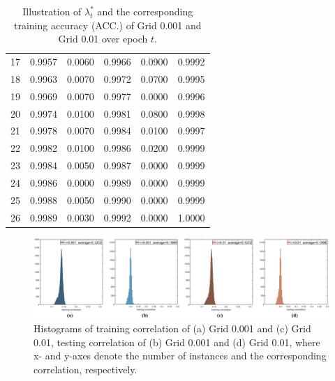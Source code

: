 \documentclass[review,10pt]{JMtemplate}
\begin{document}
\begin{table}[!htb]
\begin{tabular}{l|l|ll|ll}
        17  & 0.9957  & 0.0060  & 0.9966  & 0.0900  & 0.9992  \\ 
        18  & 0.9963  & 0.0070  & 0.9972  & 0.0700  & 0.9995  \\ 
        19  & 0.9969  & 0.0070  & 0.9977  & 0.0000  & 0.9996  \\ 
        20  & 0.9974  & 0.0100  & 0.9981  & 0.0800  & 0.9998  \\ 
        21  & 0.9978  & 0.0070  & 0.9984  & 0.0100  & 0.9997  \\ 
        22  & 0.9982  & 0.0100  & 0.9986  & 0.0200  & 0.9999  \\ 
        23  & 0.9984  & 0.0050  & 0.9987  & 0.0000  & 0.9999  \\ 
        24  & 0.9986  & 0.0000  & 0.9989  & 0.0000  & 0.9999  \\ 
        25  & 0.9988  & 0.0050  & 0.9990  & 0.0000  & 0.9999  \\ 
        26  & 0.9989  & 0.0030  & 0.9992  & 0.0000  & 1.0000  \\ 
        \bottomrule
\end{tabular}
\caption{Illustration of $\lambda^*_t$ and the corresponding training accuracy (ACC.) of Grid 0.001 and Grid 0.01 over epoch $t$.}
\label{tab:accuracy_training}
\end{table}


\begin{figure}[t]
\centering
\includegraphics[width=1\textwidth]{Figs/correlation.png}
\caption{Histograms of training correlation of (a) Grid 0.001 and (c) Grid 0.01, testing correlation of (b) Grid 0.001 and (d) Grid 0.01, where x- and y-axes denote the number of instances and the corresponding correlation, respectively.}
\label{fig:correlation}
\end{figure}
\end{document}
